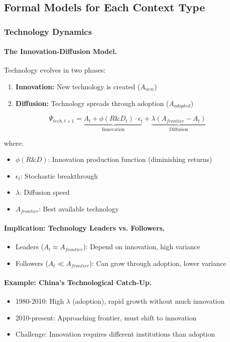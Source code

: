 \documentclass[12pt,a4paper]{article}
\begin{document}
\subsection{Formal Models for Each Context Type}

\subsubsection{Technology Dynamics}

\paragraph{The Innovation-Diffusion Model.}
Technology evolves in two phases:
\begin{enumerate}
  \item \textbf{Innovation:} New technology is created ($A_{new}$)
  \item \textbf{Diffusion:} Technology spreads through adoption ($A_{adopted}$)
\end{enumerate}

\begin{equation}
  \Psi_{tech, t+1} = \underbrace{A_t + \phi(R\&D_t) \cdot \epsilon_t}_{\text{Innovation}}
                    + \underbrace{\lambda (A_{frontier} - A_t)}_{\text{Diffusion}}
\end{equation}

where:
\begin{itemize}
  \item $\phi(R\&D)$: Innovation production function (diminishing returns)
  \item $\epsilon_t$: Stochastic breakthrough
  \item $\lambda$: Diffusion speed
  \item $A_{frontier}$: Best available technology
\end{itemize}

\paragraph{Implication: Technology Leaders vs. Followers.}
\begin{itemize}
  \item Leaders ($A_t \approx A_{frontier}$): Depend on innovation, high variance
  \item Followers ($A_t \ll A_{frontier}$): Can grow through adoption, lower variance
\end{itemize}

\paragraph{Example: China's Technological Catch-Up.}
\begin{itemize}
  \item 1980-2010: High $\lambda$ (adoption), rapid growth without much innovation
  \item 2010-present: Approaching frontier, must shift to innovation
  \item Challenge: Innovation requires different institutions than adoption
\end{itemize}
\end{document}
